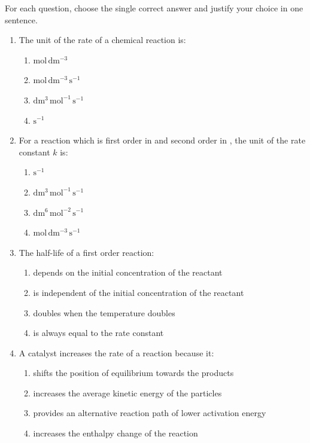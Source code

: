 \documentclass[11pt]{article}
\begin{document}
\begin{exercice}
For each question, choose the single correct answer and justify your choice in one sentence.
\begin{enumerate}
\item The unit of the rate of a chemical reaction is:
\begin{enumerate}
\item $\mathrm{mol\,dm^{-3}}$
\item $\mathrm{mol\,dm^{-3}\,s^{-1}}$
\item $\mathrm{dm^{3}\,mol^{-1}\,s^{-1}}$
\item $\mathrm{s^{-1}}$
\end{enumerate}
\item For a reaction which is first order in  and second order in , the unit of the rate constant $k$ is:
\begin{enumerate}
\item $\mathrm{s^{-1}}$
\item $\mathrm{dm^{3}\,mol^{-1}\,s^{-1}}$
\item $\mathrm{dm^{6}\,mol^{-2}\,s^{-1}}$
\item $\mathrm{mol\,dm^{-3}\,s^{-1}}$
\end{enumerate}
\item The half-life of a first order reaction:
\begin{enumerate}
\item depends on the initial concentration of the reactant
\item is independent of the initial concentration of the reactant
\item doubles when the temperature doubles
\item is always equal to the rate constant
\end{enumerate}
\item A catalyst increases the rate of a reaction because it:
\begin{enumerate}
\item shifts the position of equilibrium towards the products
\item increases the average kinetic energy of the particles
\item provides an alternative reaction path of lower activation energy
\item increases the enthalpy change of the reaction
\end{enumerate}
\end{enumerate}
\end{exercice}
\end{document}

